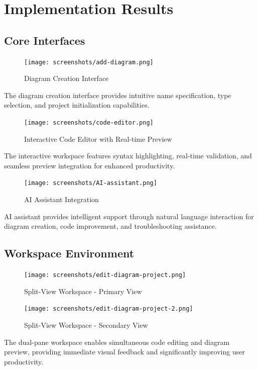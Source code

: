 \section{Implementation Results}

\subsection{Core Interfaces}

\begin{figure}[H]
\centering
\texttt{[image: screenshots/add-diagram.png]}
\caption{Diagram Creation Interface}
\end{figure}

The diagram creation interface provides intuitive name specification, type selection, and project initialization capabilities.

\begin{figure}[H]
\centering
\texttt{[image: screenshots/code-editor.png]}
\caption{Interactive Code Editor with Real-time Preview}
\end{figure}

The interactive workspace features syntax highlighting, real-time validation, and seamless preview integration for enhanced productivity.

\begin{figure}[H]
\centering
\texttt{[image: screenshots/AI-assistant.png]}
\caption{AI Assistant Integration}
\end{figure}

AI assistant provides intelligent support through natural language interaction for diagram creation, code improvement, and troubleshooting assistance.

\subsection{Workspace Environment}

\begin{figure}[H]
\centering
\texttt{[image: screenshots/edit-diagram-project.png]}
\caption{Split-View Workspace - Primary View}
\end{figure}

\begin{figure}[H]
\centering
\texttt{[image: screenshots/edit-diagram-project-2.png]}
\caption{Split-View Workspace - Secondary View}
\end{figure}

The dual-pane workspace enables simultaneous code editing and diagram preview, providing immediate visual feedback and significantly improving user productivity.

